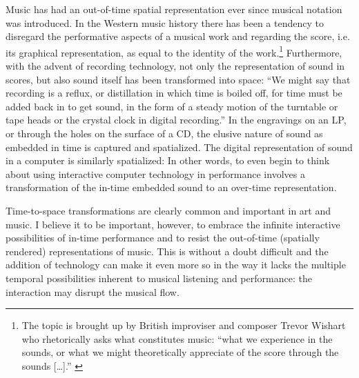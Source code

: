 \documentclass{article}
\begin{document}
Music has had an out-of-time spatial representation ever since musical notation was introduced. In the Western music history there has been a tendency to disregard the performative aspects of a musical work and regarding the score, i.e. its graphical representation, as equal to the identity of the work.\footnote{The topic is brought up by British improviser and composer Trevor Wishart who rhetorically asks what constitutes music: ``what we experience in the sounds, or what we might theoretically appreciate of the score through the sounds [\ldots].'' \cite{wis96}} Furthermore, with the advent of recording technology, not only the representation of sound in scores, but also sound itself has been transformed into space: ``We might say that recording is a reflux, or distillation in which time is boiled off, for time must be added back in to get sound, in the form of a steady motion of the turntable or tape heads or the crystal clock in digital recording.'' \citep[54]{evens05} In the engravings on an LP, or through the holes on the surface of a CD, the elusive nature of sound as embedded in time is captured and spatialized. The digital representation of sound in a computer is similarly spatialized: In other words, to even begin to think about using interactive computer technology in performance involves a transformation of the in-time embedded sound to an over-time representation.

Time-to-space transformations are clearly common and important in art and music. I believe it to be important, however, to embrace the infinite interactive possibilities of in-time performance and to resist the out-of-time (spatially rendered) representations of music. This is without a doubt difficult and the addition of technology can make it even more so in the way it lacks the multiple temporal possibilities inherent to musical listening and performance: the interaction may disrupt the musical flow.



\end{document}
